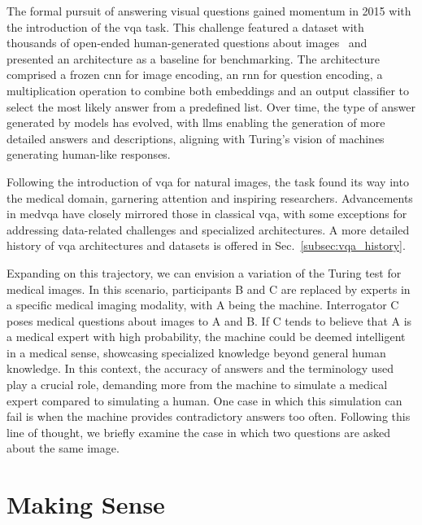 The formal pursuit of answering visual questions gained momentum in 2015 with the introduction of the \gls{vqa} task. This challenge featured a dataset with thousands of open-ended human-generated questions about images~\cite{antol2015vqa} and presented an architecture as a baseline for benchmarking. The architecture comprised a frozen \gls{cnn} for image encoding, an \gls{rnn} for question encoding, a multiplication operation to combine both embeddings and an output classifier to select the most likely answer from a predefined list. Over time, the type of answer generated by models has evolved, with \glspl{llm} enabling the generation of more detailed answers and descriptions, aligning with Turing's vision of machines generating human-like responses.

Following the introduction of \gls{vqa} for natural images, the task found its way into the medical domain, garnering attention and inspiring researchers. Advancements in \gls{medvqa} have closely mirrored those in classical \gls{vqa}, with some exceptions for addressing data-related challenges and specialized architectures. A more detailed history of \gls{vqa} architectures and datasets is offered in Sec.~\ref{subsec:vqa_history}.

Expanding on this trajectory, we can envision a variation of the Turing test for medical images. In this scenario, participants B and C are replaced by experts in a specific medical imaging modality, with A being the machine. Interrogator C poses medical questions about images to A and B. If C tends to believe that A is a medical expert with high probability, the machine could be deemed intelligent in a medical sense, showcasing specialized knowledge beyond general human knowledge. In this context, the accuracy of answers and the terminology used play a crucial role, demanding more from the machine to simulate a medical expert compared to simulating a human. One case in which this simulation can fail is when the machine provides contradictory answers too often. Following this line of thought, we briefly examine the case in which two questions are asked about the same image.


\section{Making Sense}

